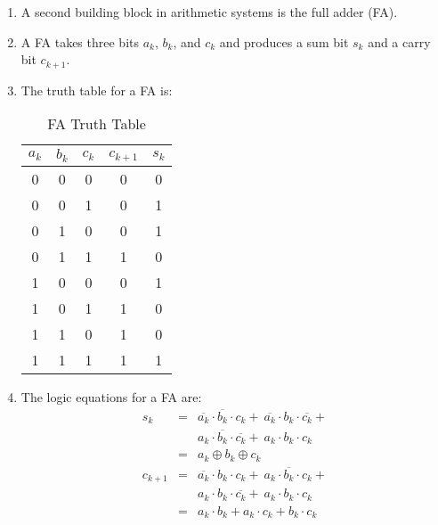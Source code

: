 \documentclass[times, twocolumn, 10pt]{article}
\begin{document}
\begin{enumerate}
\begin{enumerate}
\begin{enumerate}
    \item A second building block in arithmetic systems is the full
      adder (FA). 
    \item A FA takes three bits $a_{k}$, $b_{k}$, and $c_{k}$ and
      produces a sum 
      bit $s_{k}$ and a carry bit $c_{k+1}$. 
    \item The truth table for a FA is:
      \begin{table} [h]
	\centering
	\label{fa.tbl}
	\begin{tabular}{|c|c|c||c|c|} \hline
	  $a_{k}$ & $b_{k}$ & $c_{k}$ & $c_{k+1}$ & $s_{k}$  \\ \hline \hline
          0    &    0     &   0     &   0       &   0      \\ \hline
          0    &    0     &   1     &   0       &   1      \\ \hline
          0    &    1     &   0     &   0       &   1      \\ \hline
          0    &    1     &   1     &   1       &   0      \\ \hline
          1    &    0     &   0     &   0       &   1      \\ \hline
          1    &    0     &   1     &   1       &   0      \\ \hline
          1    &    1     &   0     &   1       &   0      \\ \hline
          1    &    1     &   1     &   1       &   1      \\ \hline
	\end{tabular}
	\caption{FA Truth Table}
      \end{table}
    \item The logic equations for a FA are:
      \begin{eqnarray*}
	s_{k}  & = & \overline{a_{k}} \cdot \overline{b_{k}} \cdot c_{k} + \
	\overline{a_{k}} \cdot b_{k} \cdot \overline{c_{k}} + \\
	& & a_{k} \cdot \overline{b_{k}} \cdot \overline{c_{k}} + \
	a_{k} \cdot b_{k} \cdot c_{k} \\
	& = & a_{k} \oplus b_{k} \oplus c_{k} \\
	c_{k+1}  & = &  \overline{a_{k}} \cdot b_{k} \cdot c_{k} + \
	a_{k} \cdot \overline{b_{k}} \cdot c_{k} + \\
	& & a_{k} \cdot b_{k} \cdot \overline{c_{k}} + \
	a_{k} \cdot b_{k} \cdot c_{k} \\
	& = &  a_{k} \cdot b_{k} +  a_{k} \cdot c_{k} +  b_{k} \cdot c_{k} 
      \end{eqnarray*}

\end{enumerate}
\end{enumerate}
\end{enumerate}
\end{document}

